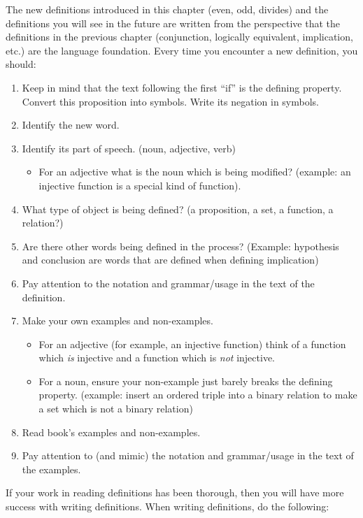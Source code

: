 \documentclass{book}
\theoremstyle{ekimcustom}
\begin{document}
The new definitions introduced in this chapter (even, odd, divides) and the definitions you will see in the future are written from the perspective that the definitions in the previous chapter (conjunction, logically equivalent, implication, etc.) are the language foundation. 
Every time you encounter a new definition, you should:
\begin{enumerate}
\item Keep in mind that the text following the first ``if'' is the defining property. Convert this proposition into symbols. Write its negation in symbols.
\item Identify the new word.
\item Identify its part of speech. (noun, adjective, verb)
\begin{itemize}
\item For an adjective what is the noun which is being modified? (example: an injective function is a special kind of function). %
\end{itemize}
\item What type of object is being defined? (a proposition, a set, a function, a relation?)
\item Are there other words being defined in the process? (Example: hypothesis and conclusion are words that are defined when defining implication)
\item Pay attention to the notation and grammar/usage in the text of the definition.
\item Make your own examples and non-examples.
\begin{itemize}
\item For an adjective (for example, an injective function) think of a function which \emph{is} injective and a function which is \emph{not} injective.
\item For a noun, ensure your non-example just barely breaks the defining property. (example: insert an ordered triple into a binary relation to make a set which is not a binary relation)
\end{itemize}
\item Read book's examples and non-examples.
\item Pay attention to (and mimic) the notation and grammar/usage in the text of the examples.
\end{enumerate}
If your work in reading definitions has been thorough, then you will have more success with writing definitions. When writing definitions, do the following:
\end{document}
